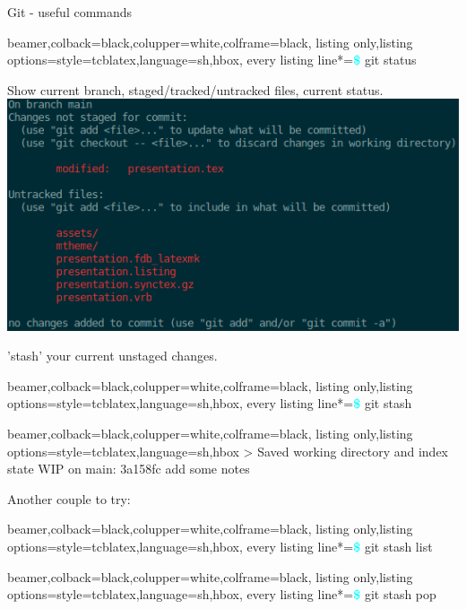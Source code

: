 \documentclass{beamer} %
\begin{document}
  \begin{frame}[fragile]{Git - useful commands}
    \begin{tcblisting}{beamer,colback=black,colupper=white,colframe=black,
      listing only,listing options={style=tcblatex,language=sh},hbox,
      every listing line*={\textcolor{cyan}{\small\ttfamily\bfseries\$}}}
  git status
    \end{tcblisting}
    Show current branch, staged/tracked/untracked files, current status.
    \includegraphics[height=.6\textheight]{git_status_output.png}
  \end{frame}

  \begin{frame}[fragile]
    'stash' your current unstaged changes.\newline
    \begin{tcblisting}{beamer,colback=black,colupper=white,colframe=black,
      listing only,listing options={style=tcblatex,language=sh},hbox,
      every listing line*={\textcolor{cyan}{\small\ttfamily\bfseries\$}}}
  git stash
    \end{tcblisting}
    
    \begin{tcblisting}{beamer,colback=black,colupper=white,colframe=black,
      listing only,listing options={style=tcblatex,language=sh},hbox}
> Saved working directory and index state WIP on main: 3a158fc add some notes
    \end{tcblisting}

    Another couple to try:
    \begin{tcblisting}{beamer,colback=black,colupper=white,colframe=black,
      listing only,listing options={style=tcblatex,language=sh},hbox,
      every listing line*={\textcolor{cyan}{\small\ttfamily\bfseries\$}}}
  git stash list
    \end{tcblisting}

    \begin{tcblisting}{beamer,colback=black,colupper=white,colframe=black,
      listing only,listing options={style=tcblatex,language=sh},hbox,
      every listing line*={\textcolor{cyan}{\small\ttfamily\bfseries\$}}}
  git stash pop
    \end{tcblisting}
    
  \end{frame}
\end{document}
